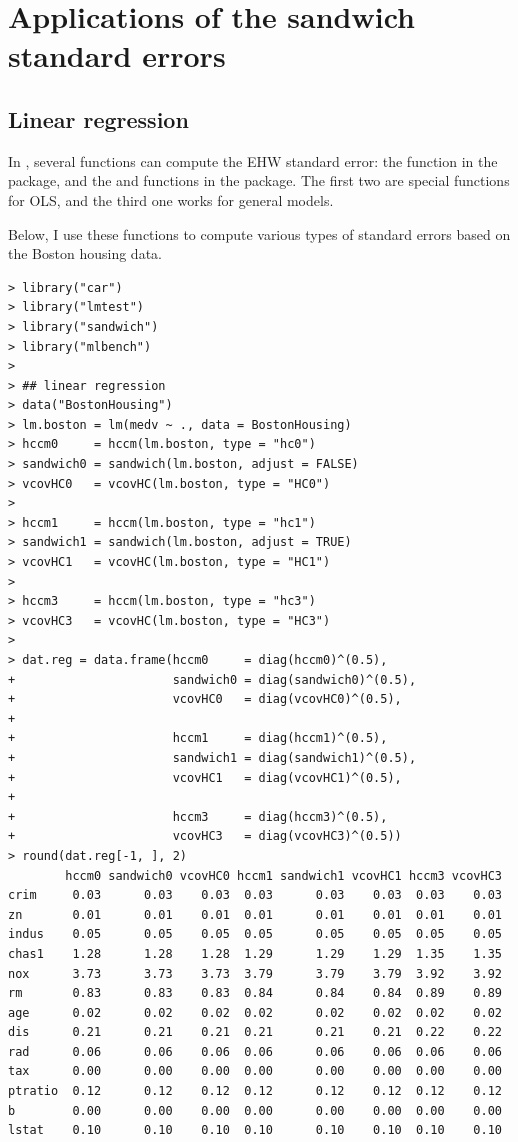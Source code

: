 \section{Applications of the sandwich standard errors}

\subsection{Linear regression}


In , several functions can compute the EHW standard error: the  function in the  package, and the  and  functions in the  package. The first two are special functions for OLS, and the third one works for general models. 


Below, I use these functions to compute various types of standard errors based on the Boston housing data. 

\begin{lstlisting}
> library("car")
> library("lmtest")
> library("sandwich")
> library("mlbench")
> 
> ## linear regression
> data("BostonHousing")
> lm.boston = lm(medv ~ ., data = BostonHousing)
> hccm0     = hccm(lm.boston, type = "hc0")
> sandwich0 = sandwich(lm.boston, adjust = FALSE)
> vcovHC0   = vcovHC(lm.boston, type = "HC0")
> 
> hccm1     = hccm(lm.boston, type = "hc1") 
> sandwich1 = sandwich(lm.boston, adjust = TRUE) 
> vcovHC1   = vcovHC(lm.boston, type = "HC1")
> 
> hccm3     = hccm(lm.boston, type = "hc3") 
> vcovHC3   = vcovHC(lm.boston, type = "HC3")
> 
> dat.reg = data.frame(hccm0     = diag(hccm0)^(0.5),
+                      sandwich0 = diag(sandwich0)^(0.5),
+                      vcovHC0   = diag(vcovHC0)^(0.5),
+                      
+                      hccm1     = diag(hccm1)^(0.5),
+                      sandwich1 = diag(sandwich1)^(0.5),
+                      vcovHC1   = diag(vcovHC1)^(0.5),
+                      
+                      hccm3     = diag(hccm3)^(0.5),
+                      vcovHC3   = diag(vcovHC3)^(0.5))
> round(dat.reg[-1, ], 2)
        hccm0 sandwich0 vcovHC0 hccm1 sandwich1 vcovHC1 hccm3 vcovHC3
crim     0.03      0.03    0.03  0.03      0.03    0.03  0.03    0.03
zn       0.01      0.01    0.01  0.01      0.01    0.01  0.01    0.01
indus    0.05      0.05    0.05  0.05      0.05    0.05  0.05    0.05
chas1    1.28      1.28    1.28  1.29      1.29    1.29  1.35    1.35
nox      3.73      3.73    3.73  3.79      3.79    3.79  3.92    3.92
rm       0.83      0.83    0.83  0.84      0.84    0.84  0.89    0.89
age      0.02      0.02    0.02  0.02      0.02    0.02  0.02    0.02
dis      0.21      0.21    0.21  0.21      0.21    0.21  0.22    0.22
rad      0.06      0.06    0.06  0.06      0.06    0.06  0.06    0.06
tax      0.00      0.00    0.00  0.00      0.00    0.00  0.00    0.00
ptratio  0.12      0.12    0.12  0.12      0.12    0.12  0.12    0.12
b        0.00      0.00    0.00  0.00      0.00    0.00  0.00    0.00
lstat    0.10      0.10    0.10  0.10      0.10    0.10  0.10    0.10
\end{lstlisting}


